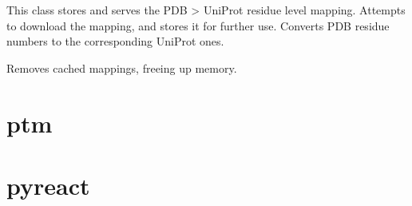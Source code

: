 \documentclass[letterpaper,10pt,english]{sphinxmanual}
\begin{document}
\begin{fulllineitems}
\label{\detokenize{reference:pypath.pdb.ResidueMapper}}
This class stores and serves the PDB \textendash{}\textgreater{} UniProt 
residue level mapping. Attempts to download the 
mapping, and stores it for further use. Converts 
PDB residue numbers to the corresponding UniProt ones.

\begin{fulllineitems}
\label{\detokenize{reference:pypath.pdb.ResidueMapper.clean}}
Removes cached mappings, freeing up memory.

\end{fulllineitems}


\end{fulllineitems}



\section{ptm}
\label{\detokenize{reference:module-pypath.ptm}}\label{\detokenize{reference:ptm}}

\section{pyreact}
\label{\detokenize{reference:module-pypath.pyreact}}\label{\detokenize{reference:pyreact}}
\end{document}
